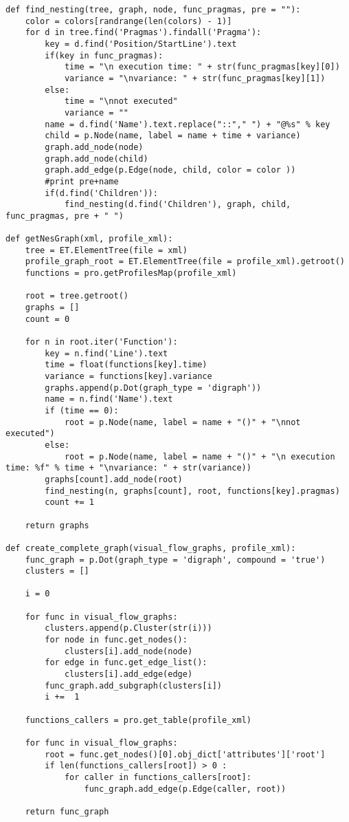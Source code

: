 \documentclass[a4paper,10pt,twoside]{book}
\begin{document}
\begin{lstlisting}[language=CCC, caption=pargraph.py]
def find_nesting(tree, graph, node, func_pragmas, pre = ""):
	color = colors[randrange(len(colors) - 1)]
	for d in tree.find('Pragmas').findall('Pragma'):
		key = d.find('Position/StartLine').text
		if(key in func_pragmas):
			time = "\n execution time: " + str(func_pragmas[key][0])
			variance = "\nvariance: " + str(func_pragmas[key][1])
		else:
			time = "\nnot executed"
			variance = ""
		name = d.find('Name').text.replace("::"," ") + "@%s" % key
		child = p.Node(name, label = name + time + variance)
		graph.add_node(node)
		graph.add_node(child)
		graph.add_edge(p.Edge(node, child, color = color ))
		#print pre+name
		if(d.find('Children')):
			find_nesting(d.find('Children'), graph, child, func_pragmas, pre + " ")

def getNesGraph(xml, profile_xml):
	tree = ET.ElementTree(file = xml) 
	profile_graph_root = ET.ElementTree(file = profile_xml).getroot()
	functions = pro.getProfilesMap(profile_xml)

	root = tree.getroot()
	graphs = []
	count = 0

	for n in root.iter('Function'):
		key = n.find('Line').text
		time = float(functions[key].time)
		variance = functions[key].variance
		graphs.append(p.Dot(graph_type = 'digraph'))
		name = n.find('Name').text
		if (time == 0):
			root = p.Node(name, label = name + "()" + "\nnot executed")
		else:
			root = p.Node(name, label = name + "()" + "\n execution time: %f" % time + "\nvariance: " + str(variance))
		graphs[count].add_node(root)
		find_nesting(n, graphs[count], root, functions[key].pragmas)
		count += 1

	return graphs

def create_complete_graph(visual_flow_graphs, profile_xml):
	func_graph = p.Dot(graph_type = 'digraph', compound = 'true')
	clusters = []

	i = 0

	for func in visual_flow_graphs:
		clusters.append(p.Cluster(str(i)))
		for node in func.get_nodes():
			clusters[i].add_node(node)
		for edge in func.get_edge_list():
			clusters[i].add_edge(edge)
		func_graph.add_subgraph(clusters[i])
		i +=  1

	functions_callers = pro.get_table(profile_xml)

	for func in visual_flow_graphs:
		root = func.get_nodes()[0].obj_dict['attributes']['root']
		if len(functions_callers[root]) > 0 :
			for caller in functions_callers[root]:
				func_graph.add_edge(p.Edge(caller, root))

	return func_graph


\end{lstlisting}
\end{document}
